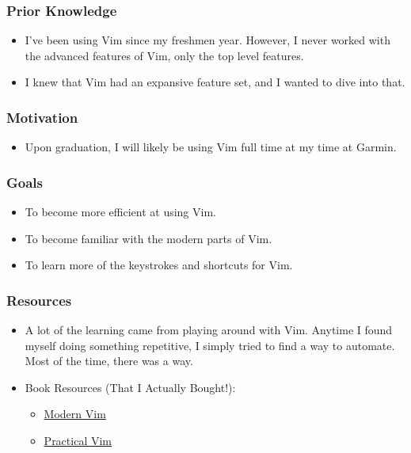 \documentclass[xclolor=dvipsnames]{beamer}            %
\begin{document}
\begin{darkframes}
    \begin{frame}
        \frametitle{Prior Knowledge}

        \begin{itemize}
            \item I've been using Vim since my freshmen year. However, I never worked with the advanced features of Vim, only the top level features.
            \item I knew that Vim had an expansive feature set, and I wanted to dive into that.
        \end{itemize}
    \end{frame}


    \begin{frame}
        \frametitle{Motivation}

        \begin{itemize}
            \item Upon graduation, I will likely be using Vim full time at my time at Garmin.
        \end{itemize}
    \end{frame}


    \begin{frame}
        \frametitle{Goals}

        \begin{itemize}
            \item To become more efficient at using Vim.
            \item To become familiar with the modern parts of Vim.
            \item To learn more of the keystrokes and shortcuts for Vim.
        \end{itemize}
    \end{frame}

    \begin{frame}
        \frametitle{Resources}

        \begin{itemize}
            \item A lot of the learning came from playing around with Vim. Anytime I found myself doing something repetitive, I simply tried to find a way to automate. Most of the time, there was a way.

            \item Book Resources (That I Actually Bought!):
                \begin{itemize}
                    \item \href{https://pragprog.com/book/modvim/modern-vim}{Modern Vim}
                    \item \href{https://pragprog.com/book/dnvim2/practical-vim-second-edition}{Practical Vim}
                \end{itemize}


\end{itemize}
\end{frame}
\end{darkframes}
\end{document}
